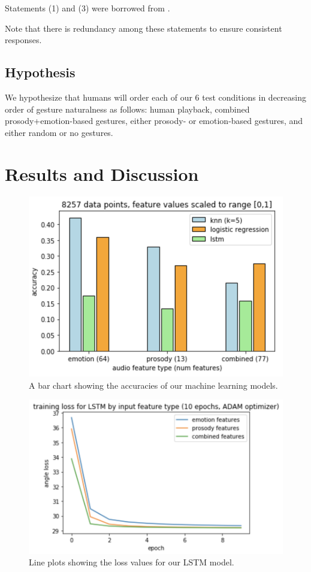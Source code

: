 Statements (1) and (3) were borrowed from \cite{levine:2}.

Note that there is redundancy among these statements to ensure consistent responses.
\subsection{Hypothesis}
We hypothesize that humans will order each of our 6 test conditions in decreasing order of gesture naturalness as follows: human playback, combined prosody+emotion-based gestures, either prosody- or emotion-based gestures, and either random or no gestures.

\section{Results and Discussion}
\begin{figure}
\includegraphics[scale=0.6]{results_new2.png}
\caption{A bar chart showing the accuracies of our machine learning models.}
\label{fig:acc}
\end{figure}

\begin{figure}
\includegraphics[scale=0.6]{loss.png}
\caption{Line plots showing the loss values for our LSTM model.}
\label{fig:loss}
\end{figure}

